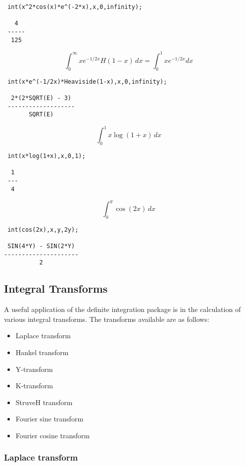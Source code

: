 \begin{verbatim}
 int(x^2*cos(x)*e^(-2*x),x,0,infinity);

   4
 -----
  125
\end{verbatim}

\[
\int_{0}^{\infty} x e^{-1/2x} H(1-x) \,dx = \int_{0}^{1} x e^{-1/2x} dx
\]

\begin{verbatim}
 int(x*e^(-1/2x)*Heaviside(1-x),x,0,infinity);

  2*(2*SQRT(E) - 3)
 -------------------
       SQRT(E)
\end{verbatim}

\[
\int_{0}^{1} x \log(1+x) \,dx
\]

\begin{verbatim}
 int(x*log(1+x),x,0,1);

  1
 ---
  4
\end{verbatim}

\[
\int_{0}^{y} \cos(2x) \,dx
\]

\begin{verbatim}
 int(cos(2x),x,y,2y);

 SIN(4*Y) - SIN(2*Y)
---------------------
          2
\end{verbatim}


\subsection{Integral Transforms}

A useful application of the definite integration package is in the
calculation of various integral transforms. The transforms
available are as follows:

\begin{itemize}
\item Laplace transform
\item Hankel transform
\item Y-transform
\item K-transform
\item StruveH transform
\item Fourier sine transform
\item Fourier cosine transform
\end{itemize}

\subsubsection{Laplace transform}
\hypertarget{operator:LAPLACE_TRANSFORM}{}

